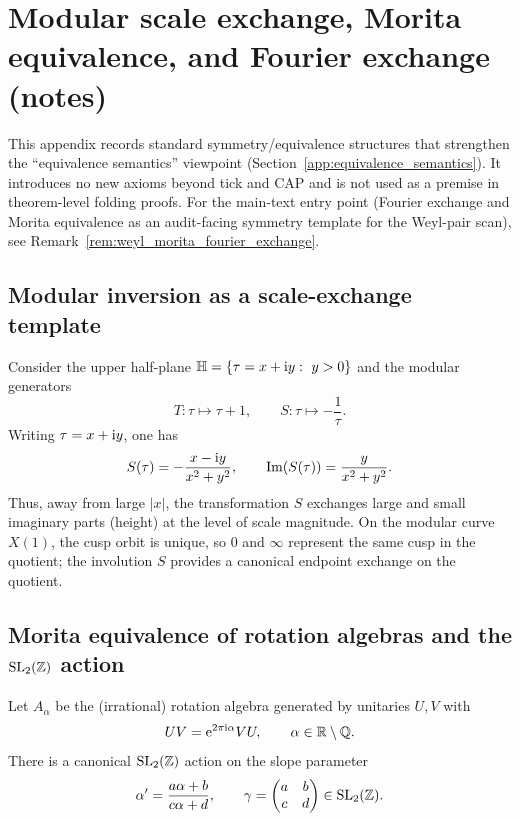 \section{Modular scale exchange, Morita equivalence, and Fourier exchange (notes)}
\label{app:morita_fourier_exchange}

\AuditTag This appendix records standard symmetry/equivalence structures that strengthen the ``equivalence semantics'' viewpoint (Section~\ref{app:equivalence_semantics}).
It introduces no new axioms beyond tick and CAP and is not used as a premise in theorem-level folding proofs.
For the main-text entry point (Fourier exchange and Morita equivalence as an audit-facing symmetry template for the Weyl-pair scan), see Remark~\ref{rem:weyl_morita_fourier_exchange}.

\subsection{Modular inversion as a scale-exchange template}
\label{subsec:morita_modular_inversion}

Consider the upper half-plane $\mathbb{H}=\{\tau=x+\mathrm{i} y:\ y>0\}$ and the modular generators
\[
T:\tau\mapsto \tau+1,\qquad
S:\tau\mapsto -\frac{1}{\tau}.
\]
Writing $\tau=x+\mathrm{i} y$, one has
\[
S(\tau)=-\frac{x-\mathrm{i} y}{x^2+y^2},
\qquad
\operatorname{Im}(S(\tau))=\frac{y}{x^2+y^2}.
\]
\InterfaceTag Thus, away from large $|x|$, the transformation $S$ exchanges large and small imaginary parts (height) at the level of scale magnitude.
On the modular curve $X(1)$, the cusp orbit is unique, so $0$ and $\infty$ represent the same cusp in the quotient; the involution $S$ provides a canonical endpoint exchange on the quotient.

\subsection{Morita equivalence of rotation algebras and the \texorpdfstring{$\mathrm{SL}_2(\mathbb{Z})$}{SL2(Z)} action}
\label{subsec:morita_rotation_algebra}

Let $A_\alpha$ be the (irrational) rotation algebra generated by unitaries $U,V$ with
\[
UV=\mathrm{e}^{2\pi\mathrm{i}\alpha}VU,\qquad \alpha\in\mathbb{R}\setminus\mathbb{Q}.
\]
There is a canonical $\mathrm{SL}_2(\mathbb{Z})$ action on the slope parameter
\[
\alpha'=\frac{a\alpha+b}{c\alpha+d},
\qquad
\gamma=\begin{pmatrix}a&b\\c&d\end{pmatrix}\in \mathrm{SL}_2(\mathbb{Z}).
\]

